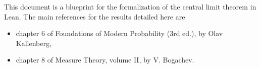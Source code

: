 
This document is a blueprint for the formalization of the central limit theorem in Lean.
The main references for the results detailed here are
\begin{itemize}
	\item chapter 6 of Foundations of Modern Probability (3rd ed.), by Olav Kallenberg,
	\item chapter 8 of Measure Theory, volume II, by V. Bogachev.
\end{itemize}






